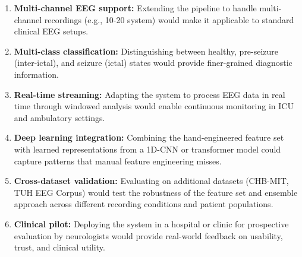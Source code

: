 \begin{enumerate}
    \item \textbf{Multi-channel EEG support:} Extending the pipeline to handle multi-channel recordings (e.g., 10-20 system) would make it applicable to standard clinical EEG setups.
    
    \item \textbf{Multi-class classification:} Distinguishing between healthy, pre-seizure (inter-ictal), and seizure (ictal) states would provide finer-grained diagnostic information.
    
    \item \textbf{Real-time streaming:} Adapting the system to process EEG data in real time through windowed analysis would enable continuous monitoring in ICU and ambulatory settings.
    
    \item \textbf{Deep learning integration:} Combining the hand-engineered feature set with learned representations from a 1D-CNN or transformer model could capture patterns that manual feature engineering misses.
    
    \item \textbf{Cross-dataset validation:} Evaluating on additional datasets (CHB-MIT, TUH EEG Corpus) would test the robustness of the feature set and ensemble approach across different recording conditions and patient populations.
    
    \item \textbf{Clinical pilot:} Deploying the system in a hospital or clinic for prospective evaluation by neurologists would provide real-world feedback on usability, trust, and clinical utility.
\end{enumerate}
